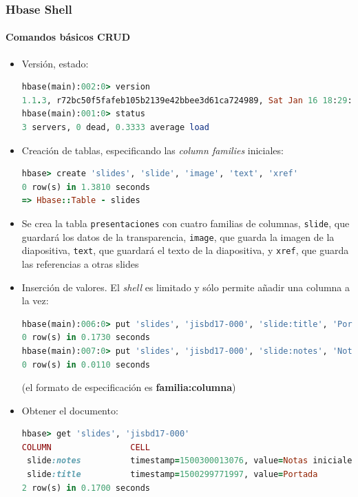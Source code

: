 \documentclass[14pt]{beamer}
\begin{document}
\begin{frame}
  \frametitle{Hbase Shell}
\framesubtitle{Comandos básicos CRUD}
\begin{itemize}
\item Versión, estado:

\begin{lstlisting}[language=ruby]
hbase(main):002:0> version
1.1.3, r72bc50f5fafeb105b2139e42bbee3d61ca724989, Sat Jan 16 18:29:00 PST 2016
hbase(main):001:0> status
3 servers, 0 dead, 0.3333 average load
\end{lstlisting}

\framebreak

\item Creación de tablas, especificando las {\em column families}
  iniciales:
\begin{lstlisting}[language=ruby]
hbase> create 'slides', 'slide', 'image', 'text', 'xref'
0 row(s) in 1.3810 seconds
=> Hbase::Table - slides
\end{lstlisting}

\item Se crea la tabla {\tt presentaciones} con cuatro familias de columnas,
  {\tt slide}, que guardará los datos de la transparencia, {\tt image}, que
  guarda la imagen de la diapositiva, {\tt text}, que guardará el texto
  de la diapositiva, y {\tt xref}, que guarda las referencias a otras slides

\framebreak

\item Inserción de valores. El {\em shell\/} es limitado y sólo permite
  añadir una columna a la vez:
\begin{lstlisting}[language=ruby,basicstyle=\scriptsize\tt]
hbase(main):006:0> put 'slides', 'jisbd17-000', 'slide:title', 'Portada'
0 row(s) in 0.1730 seconds
hbase(main):007:0> put 'slides', 'jisbd17-000', 'slide:notes', 'Notas iniciales'
0 row(s) in 0.0110 seconds
\end{lstlisting}

  (el formato de especificación es {\bf familia:columna})

\framebreak

\item Obtener el documento:

\begin{lstlisting}[language=ruby,basicstyle=\tiny\tt]
hbase> get 'slides', 'jisbd17-000'
COLUMN                CELL
 slide:notes          timestamp=1500300013076, value=Notas iniciales
 slide:title          timestamp=1500299771997, value=Portada
2 row(s) in 0.1700 seconds
\end{lstlisting}


\end{itemize}
\end{frame}
\end{document}
